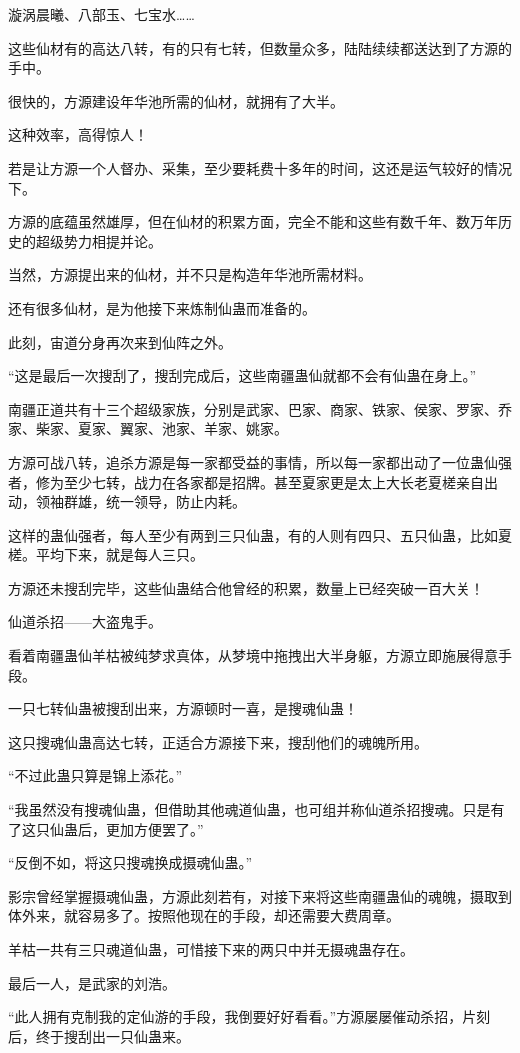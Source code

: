 \begin{this_body}
漩涡晨曦、八部玉、七宝水……

这些仙材有的高达八转，有的只有七转，但数量众多，陆陆续续都送达到了方源的手中。

很快的，方源建设年华池所需的仙材，就拥有了大半。

这种效率，高得惊人！

若是让方源一个人督办、采集，至少要耗费十多年的时间，这还是运气较好的情况下。

方源的底蕴虽然雄厚，但在仙材的积累方面，完全不能和这些有数千年、数万年历史的超级势力相提并论。

当然，方源提出来的仙材，并不只是构造年华池所需材料。

还有很多仙材，是为他接下来炼制仙蛊而准备的。

此刻，宙道分身再次来到仙阵之外。

“这是最后一次搜刮了，搜刮完成后，这些南疆蛊仙就都不会有仙蛊在身上。”

南疆正道共有十三个超级家族，分别是武家、巴家、商家、铁家、侯家、罗家、乔家、柴家、夏家、翼家、池家、羊家、姚家。

方源可战八转，追杀方源是每一家都受益的事情，所以每一家都出动了一位蛊仙强者，修为至少七转，战力在各家都是招牌。甚至夏家更是太上大长老夏槎亲自出动，领袖群雄，统一领导，防止内耗。

这样的蛊仙强者，每人至少有两到三只仙蛊，有的人则有四只、五只仙蛊，比如夏槎。平均下来，就是每人三只。

方源还未搜刮完毕，这些仙蛊结合他曾经的积累，数量上已经突破一百大关！

仙道杀招——大盗鬼手。

看着南疆蛊仙羊枯被纯梦求真体，从梦境中拖拽出大半身躯，方源立即施展得意手段。

一只七转仙蛊被搜刮出来，方源顿时一喜，是搜魂仙蛊！

这只搜魂仙蛊高达七转，正适合方源接下来，搜刮他们的魂魄所用。

“不过此蛊只算是锦上添花。”

“我虽然没有搜魂仙蛊，但借助其他魂道仙蛊，也可组并称仙道杀招搜魂。只是有了这只仙蛊后，更加方便罢了。”

“反倒不如，将这只搜魂换成摄魂仙蛊。”

影宗曾经掌握摄魂仙蛊，方源此刻若有，对接下来将这些南疆蛊仙的魂魄，摄取到体外来，就容易多了。按照他现在的手段，却还需要大费周章。

羊枯一共有三只魂道仙蛊，可惜接下来的两只中并无摄魂蛊存在。

最后一人，是武家的刘浩。

“此人拥有克制我的定仙游的手段，我倒要好好看看。”方源屡屡催动杀招，片刻后，终于搜刮出一只仙蛊来。


\end{this_body}

